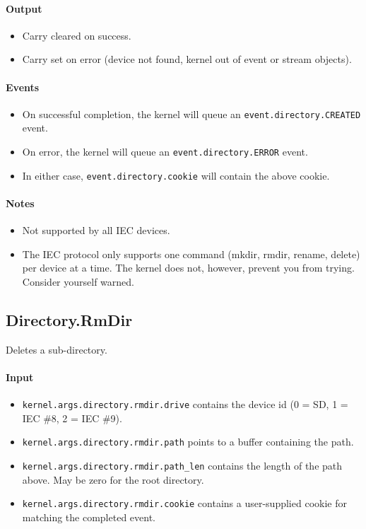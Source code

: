 \paragraph{Output}
\begin{itemize}
\item Carry cleared on success.
\item Carry set on error (device not found, kernel out of event or stream objects).
\end{itemize}

\paragraph{Events}
\begin{itemize}
\item On successful completion, the kernel will queue an \verb+event.directory.CREATED+ event.
\item On error, the kernel will queue an \verb+event.directory.ERROR+ event.
\item In either case, \verb+event.directory.cookie+ will contain the above cookie.
\end{itemize}

\paragraph{Notes}
\begin{itemize}
\item Not supported by all IEC devices.
\item The IEC protocol only supports one command (mkdir, rmdir, rename, delete) per device at a time.  The kernel does not, however, prevent you from trying.  Consider yourself warned.
\end{itemize}

\subsection*{Directory.RmDir}
Deletes a sub-directory.

\paragraph{Input}
\begin{itemize}
\item \verb+kernel.args.directory.rmdir.drive+ contains the device id (0 = SD, 1 = IEC \#8, 2 = IEC \#9).
\item \verb+kernel.args.directory.rmdir.path+ points to a buffer containing the path.
\item \verb+kernel.args.directory.rmdir.path_len+ contains the length of the path above.  May be zero for the root directory.
\item \verb+kernel.args.directory.rmdir.cookie+ contains a user-supplied cookie for matching the completed event.
\end{itemize}

